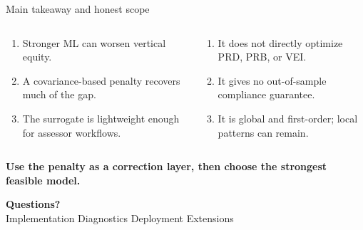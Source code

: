 \documentclass[aspectratio=169,10pt]{beamer}
\begin{document}
\begin{frame}{Main takeaway and honest scope}
\begin{columns}[T,onlytextwidth]
\begin{tcolorbox}[colback=Good!6,colframe=Good!65,title=Takeaway,arc=1.5mm]
\begin{enumerate}
\item Stronger ML can worsen vertical equity.
\item A covariance-based penalty recovers much of the gap.
\item The surrogate is lightweight enough for assessor workflows.
\end{enumerate}
\end{tcolorbox}

\begin{tcolorbox}[colback=Panel,colframe=LineGray,title=Scope,arc=1.5mm]
\begin{enumerate}
\item It does not directly optimize PRD, PRB, or VEI.
\item It gives no out-of-sample compliance guarantee.
\item It is global and first-order; local patterns can remain.
\end{enumerate}
\end{tcolorbox}
\end{columns}

\vspace{5mm}
\begin{center}
\textbf{Use the penalty as a correction layer, then choose the strongest feasible model.}
\end{center}
\end{frame}

\begin{frame}[plain]
\vfill
\begin{center}
{\Huge\bfseries Questions?}\\[5mm]
{\footnotesize Implementation \quad Diagnostics \quad Deployment \quad Extensions}
\end{center}
\vfill
\end{frame}

\appendix
\end{document}
